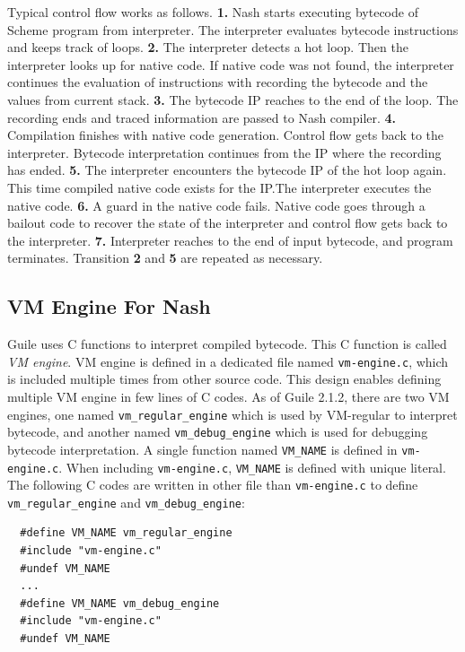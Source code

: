\documentclass[preprint, 10pt]{sigplanconf}
\begin{document}
Typical control flow works as follows.  \textbf{1.} Nash starts executing
bytecode of Scheme program from interpreter. The interpreter evaluates
bytecode instructions and keeps track of loops. \textbf{2.} The interpreter
detects a hot loop. Then the interpreter looks up for native code. If native
code was not found, the interpreter continues the evaluation of instructions
with recording the bytecode and the values from current stack.  \textbf{3.}
The bytecode IP reaches to the end of the loop. The recording ends and traced
information are passed to Nash compiler. \textbf{4.} Compilation finishes with
native code generation. Control flow gets back to the interpreter. Bytecode
interpretation continues from the IP where the recording has
ended. \textbf{5.} The interpreter encounters the bytecode IP of the hot loop
again. This time compiled native code exists for the IP.\@ The interpreter
executes the native code.  \textbf{6.} A guard in the native code
fails. Native code goes through a bailout code to recover the state of the
interpreter and control flow gets back to the interpreter. \textbf{7.}
Interpreter reaches to the end of input bytecode, and program terminates.
Transition \textbf{2} and \textbf{5} are repeated as necessary.

\subsection{VM Engine For Nash}

Guile uses C functions to interpret compiled bytecode. This C function is
called \textit{VM engine}. VM engine is defined in a dedicated file named
\texttt{vm-engine.c}, which is included multiple times from other source
code. This design enables defining multiple VM engine in few lines of C
codes. As of Guile 2.1.2, there are two VM engines, one named
\texttt{vm\_regular\_engine} which is used by VM-regular to interpret
bytecode, and another named \texttt{vm\_debug\_engine} which is used for
debugging bytecode interpretation. A single function named \texttt{VM\_NAME}
is defined in \texttt{vm-engine.c}.  When including \texttt{vm-engine.c},
\texttt{VM\_NAME} is defined with unique literal. The following C codes are
written in other file than \texttt{vm-engine.c} to define
\texttt{vm\_regular\_engine} and \texttt{vm\_debug\_engine}:

\begin{verbatim}
  #define VM_NAME vm_regular_engine
  #include "vm-engine.c"
  #undef VM_NAME
  ...
  #define VM_NAME vm_debug_engine
  #include "vm-engine.c"
  #undef VM_NAME
\end{verbatim}
\end{document}
